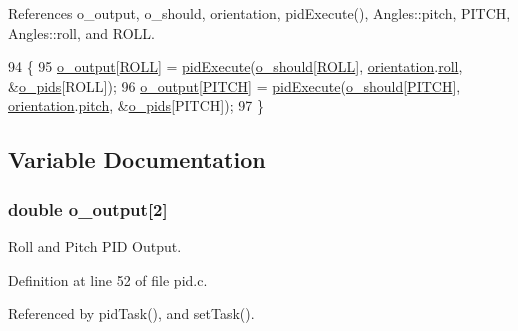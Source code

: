 References o\-\_\-output, o\-\_\-should, orientation, pid\-Execute(), Angles\-::pitch, P\-I\-T\-C\-H, Angles\-::roll, and R\-O\-L\-L.


\begin{DoxyCode}
94                    \{
95     \hyperlink{group__pid_gaf457b38bb75f72a89bac9b4a9570bd99}{o\_output}[\hyperlink{group__pid_gaf902416f65138704a180dbae2dc9d8f2}{ROLL}] = \hyperlink{group__pid_gaa373eb9da73ef4da4195fd5114555772}{pidExecute}(\hyperlink{group__pid_ga3e9b95260c17d0da155fb4eede660d03}{o\_should}[\hyperlink{group__pid_gaf902416f65138704a180dbae2dc9d8f2}{ROLL}], 
      \hyperlink{group__orientation_gacd4a2942520b68691db5aebde4e537a4}{orientation}.\hyperlink{struct_angles_a1d3228afa3a1d6773954f40c1e519eb9}{roll}, &\hyperlink{group__pid_gaf8f428e17178b1f15edba7158fd831da}{o\_pids}[ROLL]);
96     \hyperlink{group__pid_gaf457b38bb75f72a89bac9b4a9570bd99}{o\_output}[\hyperlink{group__pid_gacd633835a520a62245ec6cfeb6d00e97}{PITCH}] = \hyperlink{group__pid_gaa373eb9da73ef4da4195fd5114555772}{pidExecute}(\hyperlink{group__pid_ga3e9b95260c17d0da155fb4eede660d03}{o\_should}[\hyperlink{group__pid_gacd633835a520a62245ec6cfeb6d00e97}{PITCH}], 
      \hyperlink{group__orientation_gacd4a2942520b68691db5aebde4e537a4}{orientation}.\hyperlink{struct_angles_a34c057a0378030db67bd6a129f37d938}{pitch}, &\hyperlink{group__pid_gaf8f428e17178b1f15edba7158fd831da}{o\_pids}[PITCH]);
97 \}
\end{DoxyCode}


\subsection{Variable Documentation}
\hypertarget{group__pid_gaf457b38bb75f72a89bac9b4a9570bd99}{
\subsubsection[{o\-\_\-output}]{\setlength{\rightskip}{0pt plus 5cm}double o\-\_\-output\mbox{[}2\mbox{]}}}\label{group__pid_gaf457b38bb75f72a89bac9b4a9570bd99}


Roll and Pitch P\-I\-D Output. 



Definition at line 52 of file pid.\-c.



Referenced by pid\-Task(), and set\-Task().

